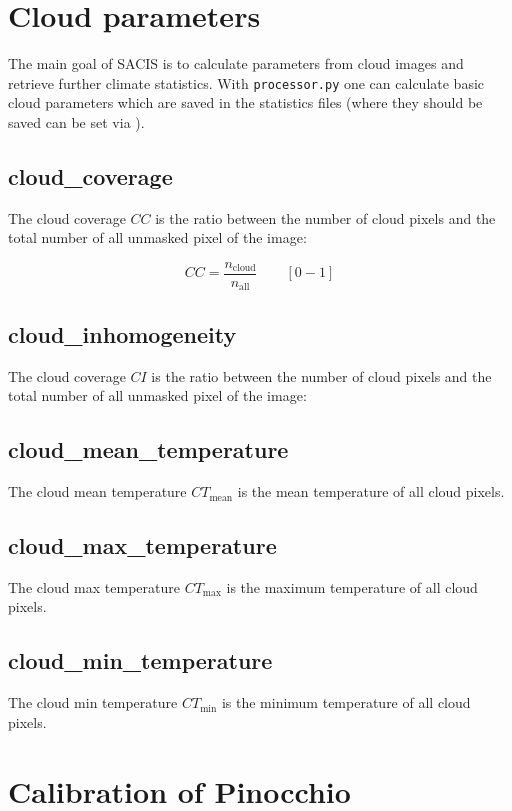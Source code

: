 \documentclass[11pt,a4paper]{article}
\begin{document}
\section{Cloud parameters}
\label{sec:cloud-parameters}
The main goal of SACIS is to calculate parameters from cloud images and retrieve further climate statistics. With \texttt{processor.py} one can calculate basic cloud parameters which are saved in the statistics files (where they should be saved can be set via ).

\subsection{cloud\_coverage}
The cloud coverage $CC$ is the ratio between the number of cloud pixels and the total number of all unmasked pixel of the image:

\begin{equation}
	CC = \frac{n_\text{cloud}}{n_\text{all}} \qquad [0 - 1]
\end{equation}

\subsection{cloud\_inhomogeneity}
The cloud coverage $CI$ is the ratio between the number of cloud pixels and the total number of all unmasked pixel of the image:

\subsection{cloud\_mean\_temperature}
The cloud mean temperature $CT_\text{mean}$ is the mean temperature of all cloud pixels.

\subsection{cloud\_max\_temperature}
The cloud max temperature $CT_\text{max}$ is the maximum temperature of all cloud pixels.

\subsection{cloud\_min\_temperature}
The cloud min temperature $CT_\text{min}$ is the minimum temperature of all cloud pixels.

\section{Calibration of Pinocchio}
\label{sec:calibration}
\end{document}
